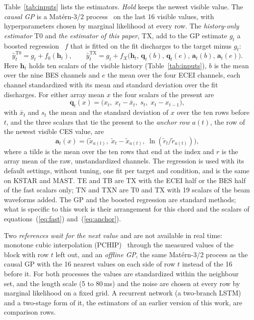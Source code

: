 \documentclass[11pt,a4paper]{article}
\begin{document}
Table~\ref{tab:inputs} lists the estimators. \emph{Hold} keeps the newest visible value. The \emph{causal GP} is a Mat\'ern-3/2 process~\citep{rasmussen2006} on the last 16 visible values, with hyperparameters chosen by marginal likelihood at every row. The \emph{history-only estimator} T0 and \emph{the estimator of this paper}, TX, add to the GP estimate $g_t$ a boosted regression~\citep{Friedman2001GreedyFunction,Pedregosa2011ScikitLearn} $f$ that is fitted on the fit discharges to the target minus $g_t$:
\begin{equation}
  \hat y_t^{\mathrm{T0}} = g_t + f_0(\mathbf h_t), \qquad
  \hat y_t^{\mathrm{TX}} = g_t + f_X\bigl(\mathbf h_t,\, \mathbf q_t(b),\, \mathbf q_t(e),\,
  \mathbf a_t(b),\, \mathbf a_t(e)\bigr).
  \label{eq:est}
\end{equation}
Here $\mathbf h_t$ holds ten scalars of the visible history (Table~\ref{tab:inputs}), $b$ is the mean over the nine BES channels and $e$ the mean over the four ECEI channels, each channel standardized with its mean and standard deviation over the fit discharges. For either array mean $x$ the four scalars of the present are
\begin{equation}
  \mathbf q_t(x) = \bigl(x_t,\; x_t - \bar x_t,\; s_t,\; x_t - x_{t-1}\bigr),
  \label{eq:fast}
\end{equation}
with $\bar x_t$ and $s_t$ the mean and the standard deviation of $x$ over the ten rows before $t$, and the three scalars that tie the present to the \emph{anchor row} $a(t)$, the row of the newest visible CES value, are
\begin{equation}
  \mathbf a_t(x) = \bigl(\tilde x_{a(t)},\; \tilde x_t - \tilde x_{a(t)},\;
  \ln(\tilde r_t / \tilde r_{a(t)})\bigr),
  \label{eq:anchor}
\end{equation}
where a tilde is the mean over the ten rows that end at the index and $r$ is the array mean of the raw, unstandardized channels. The regression is used with its default settings, without tuning, one fit per target and condition, and is the same on KSTAR and MAST. TE and TB are TX with the ECEI half or the BES half of the fast scalars only; TN and TXN are T0 and TX with 19 scalars of the beam waveforms added. The GP and the boosted regression are standard methods; what is specific to this work is their arrangement for this chord and the scalars of equations~(\ref{eq:fast}) and~(\ref{eq:anchor}).

Two \emph{references wait for the next value} and are not available in real time: monotone cubic interpolation (PCHIP)~\citep{fritsch1980} through the measured values of the block with row $t$ left out, and an \emph{offline GP}, the same Mat\'ern-3/2 process as the causal GP with the 16 nearest values on each side of row $t$ instead of the 16 before it. For both processes the values are standardized within the neighbour set, and the length scale (5 to 80\,ms) and the noise are chosen at every row by marginal likelihood on a fixed grid. A recurrent network (a two-branch LSTM) and a two-stage form of it, the estimators of an earlier version of this work, are comparison rows.
\end{document}
